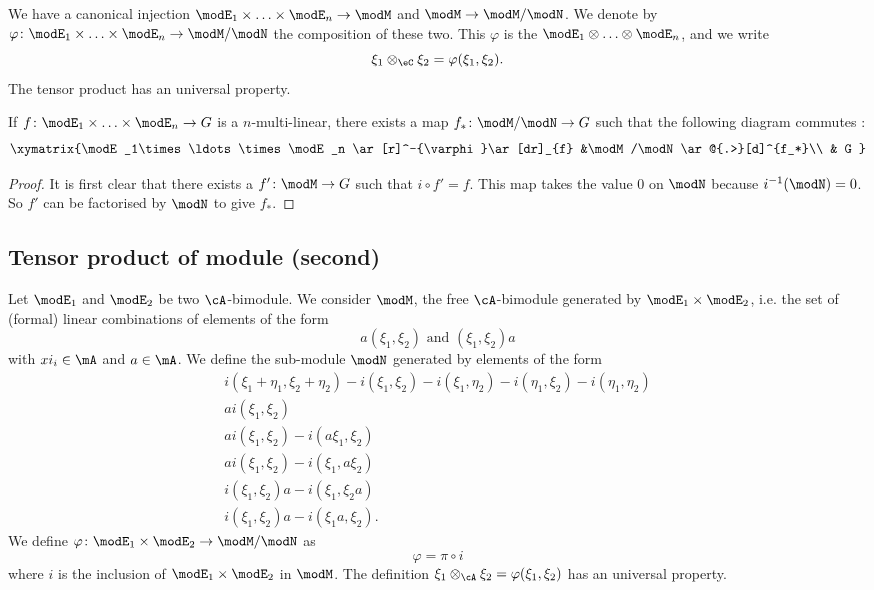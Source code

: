 We have a canonical injection $\modE_1\times\ldots\times\modE_n\to\modM$ and $\modM\to\modM/\modN$. We denote by $\varphi\colon \modE_1\times\ldots\times\modE_n\to \modM/\modN$ the composition of these two. This $\varphi$ is the  $\modE_1\otimes\ldots\otimes\modE_n$, and we write
\[ 
  \xi_1\otimes_{\eC}\xi_2=\varphi(\xi_1,\xi_2).
\]
The tensor product has an universal property.

\begin{proposition}
If $f\colon \modE_1\times\ldots\times\modE_n\to G$ is a $n$-multi-linear, there exists a map $f_*\colon \modM/\modN\to G$ such that the following diagram commutes :
\begin{equation}
\xymatrix{%
   \modE_1\times\ldots\times\modE_n \ar[r]^-{\varphi}\ar[dr]_{f}		&\modM/\modN\ar@{.>}[d]^{f_*}\\
   									&	G
}
\end{equation}
\end{proposition}

\begin{proof}
It is first clear that there exists a $f'\colon \modM\to G$ such that $i\circ f'=f$. This map takes the value $0$ on $\modN$ because $i^{-1}(\modN)=0$. So $f'$ can be factorised by $\modN$ to give $f_*$.
\end{proof}

\subsection{Tensor product of module (second)}

Let $\modE_1$ and $\modE_2$ be two $\cA$-bimodule. We consider $\modM$, the free $\cA$-bimodule generated by $\modE_1\times\modE_2$, i.e. the set of (formal) linear combinations of elements of the form
\[ 
  a(\xi_1,\xi_2)\text{ and }(\xi_1,\xi_2)a
\]
with $xi_i\in\mA$ and $a\in\mA$. We define the sub-module $\modN$ generated by elements of the form
\begin{subequations}
\begin{align}
i(\xi_1+\eta_1,\xi_2+\eta_2)-i(\xi_1,\xi_2)-i(\xi_1,\eta_2)-i(\eta_1,\xi_2)-i(\eta_1,\eta_2)\\
ai(\xi_1,\xi_2)\\
ai(\xi_1,\xi_2)-i(a\xi_1,\xi_2)\\
ai(\xi_1,\xi_2)-i(\xi_1,a\xi_2)\\
i(\xi_1,\xi_2)a-i(\xi_1,\xi_2a)\\
i(\xi_1,\xi_2)a-i(\xi_1a,\xi_2).
\end{align}
\end{subequations}
We define $\varphi\colon \modE_1\times\modE_2\to \modM/\modN$ as 
\[ 
  \varphi=\pi\circ i
\]
where $i$ is the inclusion of $\modE_1\times\modE_2$ in $\modM$. The definition $\xi_1\otimes_{\cA}\xi_2=\varphi(\xi_1,\xi_2)$ has an universal property.

